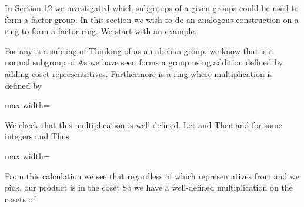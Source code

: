 \documentclass[11pt,oneside]{article}
\begin{document}
\fi
\renewcommand{\BookFooter}{Section 30 Homomorphisms and Factor Rings}
\ifdefined\BookMaster\else\setcounter{page}{243}\fi
\BookNarrativetrue

\begin{BookBody}



\noindent In Section 12 we investigated which subgroups of a given groups could be used to form a factor group. In this section we wish to do an analogous construction on a ring to form a factor ring. We start with an example.

 For any  is a subring of  Thinking of  as an abelian group, we know that  is a normal subgroup of  As we have seen forms a group using addition defined by adding coset representatives. Furthermore is a ring where multiplication is defined by

\begin{center}\begin{adjustbox}{max width=\linewidth}\end{adjustbox}\end{center}

\noindent We check that this multiplication is well defined. Let  and  Then  and  for some integers  and  Thus

\begin{center}\begin{adjustbox}{max width=\linewidth}\end{adjustbox}\end{center}

\noindent From this calculation we see that regardless of which representatives from  and  we pick, our product is in the coset  So we have a well-defined multiplication on the cosets of \BookEnd{\blacktriangle}

\end{BookBody}
\end{document}
